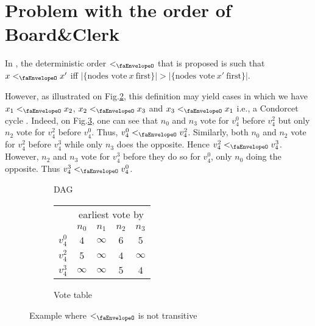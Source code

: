 


\section{Problem with the order of Board\&Clerk\label{anx:bug_board_and_clerk}}

In \cite{reducing_latency_of_dag_based_consensus_in_the_asynchronous_setting_via_the_utxo_model}, the deterministic order $<_{\text{\faEnvelopeO}}$ that is proposed is such that $x <_{\text{\faEnvelopeO}} x'$ iff $|\{\text{nodes vote}~x~\text{first}\}| > |\{\text{nodes vote}~x'~\text{first}\}|$.

However, as illustrated on Fig.\ref{fig:do_counter_ex_board_and_clerk_votes}, this definition may yield cases in which we have $x_1 <_{\text{\faEnvelopeO}} x_2$, $x_2 <_{\text{\faEnvelopeO}} x_3$ and $x_3 <_{\text{\faEnvelopeO}} x_1$ i.e., a Condorcet cycle \cite{condorcet_attack_against_fair_transaction_ordering}. 
Indeed, on Fig.\ref{fig:do_counter_ex_board_and_clerk}, one can see that $n_0$ and $n_3$ vote for $v_4^0$ before $v_4^2$ but only $n_2$ vote for $v_4^2$ before $v_4^0$. Thus, $v_4^0 <_{\text{\faEnvelopeO}} v_4^2$.
Similarly, both $n_0$ and $n_2$ vote for $v_4^2$ before $v_4^3$ while only $n_3$ does the opposite. Hence $v_4^2 <_{\text{\faEnvelopeO}} v_4^3$.
However, $n_2$ and $n_3$ vote for $v_4^3$ before they do so for $v_4^0$, only $n_0$ doing the opposite.
Thus $v_4^3 <_{\text{\faEnvelopeO}} v_4^0$.


\begin{figure}[h]
    \centering

\begin{subfigure}{.15\textwidth}
    \centering
    \scalebox{.8}{}
    \caption{DAG}
    \label{fig:do_counter_ex_board_and_clerk_dag}
\end{subfigure}
%
\begin{subfigure}{.3\textwidth}
    \centering
\begin{tabular}{|c|c|c|c|c|}
\hline
\multirow{2}{*}{} & \multicolumn{4}{c|}{earliest vote by} \\
\cline{2-5} 
     & $n_0$ & $n_1$ & $n_2$ & $n_3$ \\
     \hline 
$v_4^0$ & $4$ & $\infty$ & $6$ & $5$ \\
\hline 
$v_4^2$ & $5$ & $\infty$ & $4$ & $\infty$ \\
\hline 
$v_4^3$ & $\infty$ & $\infty$ & $5$ & $4$ \\
\hline 
\end{tabular}
    \caption{Vote table}
    \label{fig:do_counter_ex_board_and_clerk_votes}
\end{subfigure}

    
    \caption{Example where $<_{\text{\faEnvelopeO}}$ is not transitive}
    \label{fig:do_counter_ex_board_and_clerk}
\end{figure}




